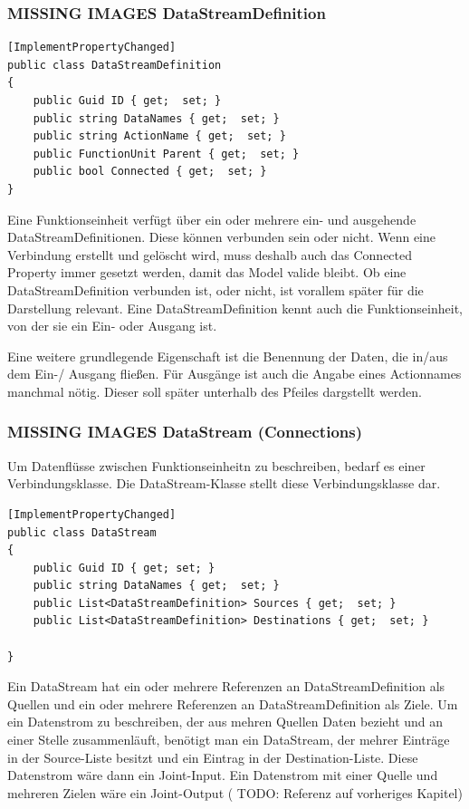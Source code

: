 	\subsubsection{MISSING IMAGES DataStreamDefinition}
	
	\begin{lstlisting}[caption=DataStreamDefinition Klasse]
[ImplementPropertyChanged]
public class DataStreamDefinition
{
	public Guid ID { get;  set; }
	public string DataNames { get;  set; }
	public string ActionName { get;  set; }
	public FunctionUnit Parent { get;  set; }
	public bool Connected { get;  set; }
}
	\end{lstlisting}
	
	Eine Funktionseinheit verfügt über ein oder mehrere ein- und ausgehende
	DataStreamDefinitionen. Diese können verbunden sein oder nicht. Wenn eine
	Verbindung erstellt und gelöscht wird, muss deshalb auch das Connected
	Property immer gesetzt werden, damit das Model valide bleibt.
	Ob eine DataStreamDefinition verbunden ist, oder nicht, ist vorallem später
	für die Darstellung relevant.
	Eine DataStreamDefinition kennt auch die Funktionseinheit, von der sie ein
	Ein- oder Ausgang ist.
	
	Eine weitere grundlegende Eigenschaft ist die Benennung der Daten, die in/aus
	dem Ein-/ Ausgang fließen. Für Ausgänge ist auch die Angabe eines
	Actionnames manchmal nötig. Dieser soll später unterhalb des Pfeiles
	dargstellt werden.


\subsubsection{{\bfseries\sffamily MISSING IMAGES} DataStream (Connections)}

Um Datenflüsse zwischen Funktionseinheitn zu beschreiben, bedarf es einer
Verbindungsklasse. Die DataStream-Klasse stellt diese Verbindungsklasse dar.


\begin{lstlisting}[caption=DataStream]
[ImplementPropertyChanged]
public class DataStream
{
	public Guid ID { get; set; }
	public string DataNames { get;  set; }
	public List<DataStreamDefinition> Sources { get;  set; }
	public List<DataStreamDefinition> Destinations { get;  set; }

}
\end{lstlisting}

Ein DataStream hat ein oder mehrere Referenzen an DataStreamDefinition als
Quellen und ein oder mehrere Referenzen an DataStreamDefinition als Ziele.
Um ein Datenstrom zu beschreiben, der aus mehren Quellen Daten bezieht und
an einer Stelle zusammenläuft, benötigt man ein DataStream, der mehrer
Einträge in der Source-Liste besitzt und ein Eintrag in der
Destination-Liste. Diese Datenstrom wäre dann ein Joint-Input.
Ein Datenstrom mit einer Quelle und mehreren Zielen wäre ein Joint-Output ( TODO:
Referenz auf vorheriges Kapitel)

